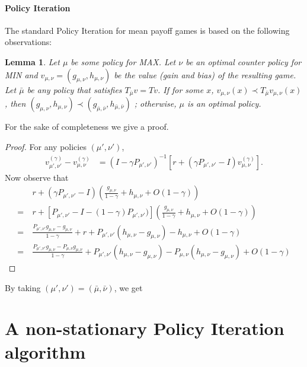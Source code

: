 \documentclass{article}
\newtheorem{lemma}{Lemma}
\begin{document}
\paragraph{Policy Iteration}

The standard Policy Iteration for mean payoff games is based on the following observations:
\begin{lemma}
  Let $\mu$ be some policy for MAX. Let $\nu$ be an optimal counter policy for MIN and $v_{\mu,\nu}=(g_{\mu,\nu},h_{\mu,\nu})$ be the value (gain and bias) of the resulting game. Let $\bar\mu$ be any policy that satisfies $T_{\bar\mu}v=T v$. If for some $x$, $v_{\mu,\nu}(x) \prec T_{\bar\mu}v_{\mu,\nu}(x)$, then $(g_{\mu,\nu},h_{\mu,\nu}) \prec (g_{\bar\mu,\bar\nu},h_{\bar\mu,\bar\nu})$ ; otherwise, $\mu$ is an optimal policy.
\end{lemma}

For the sake of completeness we give a proof.
\begin{proof}
  For any policies $(\mu',\nu')$,
  \begin{align}
    v^{(\gamma)}_{\mu',\nu'} - v^{(\gamma)}_{\mu,\nu} &= (I-\gamma P_{\mu',\nu'})^{-1}[ r + (\gamma P_{\mu',\nu'}-I)v^{(\gamma)}_{\mu,\nu} ].
  \end{align}
  Now observe that
  \begin{align}
     & r + (\gamma P_{\mu',\nu'}-I)\left( \frac{g_{\mu,\nu}}{1-\gamma} + h_{\mu,\nu} + O(1-\gamma) \right) \\
     =~ &r + [P_{\mu',\nu'}-I-(1-\gamma)P_{\mu',\nu'})]\left( \frac{g_{\mu,\nu}}{1-\gamma} + h_{\mu,\nu} + O(1-\gamma) \right) \\
     =~ & \frac{P_{\mu',\nu'}g_{\mu,\nu}-g_{\mu,\nu}}{1-\gamma} + r + P_{\mu',\nu'}(h_{\mu,\nu}-g_{\mu,\nu}) -h_{\mu,\nu} + O(1-\gamma) \\
     =~ & \frac{P_{\mu',\nu'}g_{\mu,\nu}-P_{\mu,\nu}g_{\mu,\nu}}{1-\gamma} + P_{\mu',\nu'}(h_{\mu,\nu}-g_{\mu,\nu}) -P_{\mu,\nu} (h_{\mu,\nu}-g_{\mu,\nu}) + O(1-\gamma)
  \end{align}
\end{proof}
By taking $(\mu',\nu')=(\bar\mu,\bar\nu)$, we get

  


    
\section{A non-stationary Policy Iteration algorithm}
\label{algo}
\end{document}

